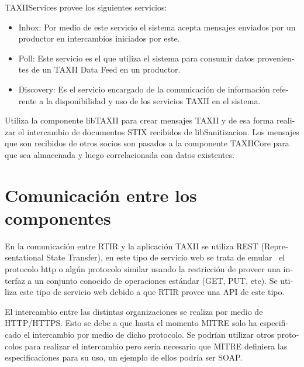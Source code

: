 \documentclass[11pt]{article}
\begin{document}
\foreignlanguage{spanish}{TAXIIServices provee los siguientes servicios:}

\liststyleWWNumi
\begin{itemize}
\item \foreignlanguage{spanish}{Inbox: Por medio de este servicio el sistema acepta mensajes enviados por un productor
en intercambios iniciados por este. }
\item \foreignlanguage{spanish}{Poll: Este servicio es el que utiliza el sistema para consumir datos provenientes de un
TAXII Data Feed en un productor.}
\item \foreignlanguage{spanish}{Discovery: Es el servicio encargado de la comunicación de información referente a la
disponibilidad y uso de los servicios TAXII en el sistema.}
\end{itemize}
\foreignlanguage{spanish}{Utiliza la componente libTAXII para crear mensajes TAXII y de esa forma realizar el
intercambio de documentos STIX recibidos de libSanitizacion. Los mensajes que son recibidos de otros socios son pasados
a la componente TAXIICore para que sea almacenada y luego correlacionada con datos existentes. }


\bigskip


\bigskip

\section[Comunicación entre los componentes]{\foreignlanguage{spanish}{Comunicación entre los componentes}}

\bigskip

\foreignlanguage{spanish}{En la comunicación entre RTIR y la aplicación TAXII se utiliza REST (Representational State
Transfer), en este tipo de servicio web se trata de emular \ el protocolo http o algún protocolo similar usando la
restricción de proveer una interfaz a un conjunto conocido de operaciones estándar (GET, PUT, etc). Se utiliza este
tipo de servicio web debido a que RTIR provee una API de este tipo. }


\bigskip

\foreignlanguage{spanish}{El intercambio entre las distintas organizaciones se realiza por medio de HTTP/HTTPS. Esto se
debe a que hasta el momento MITRE solo ha especificado el intercambio por medio de dicho protocolo. Se podrían utilizar
otros protocolos para realizar el intercambio pero sería necesario que MITRE definiera las especificaciones para su
uso, un ejemplo de ellos podría ser SOAP.}
\end{document}
